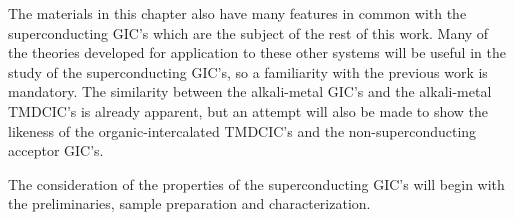         The materials  in this chapter  also have  many features in  common
with the superconducting  GIC's which are the subject  of the  rest of this
work.   Many of  the theories  developed   for  application to  these other
systems will  be useful in the study  of  the  superconducting GIC's, so  a
familiarity  with the previous  work is mandatory.   The similarity between
the alkali-metal GIC's  and the alkali-metal  TMDCIC's is already apparent,
but an  attempt will    also  be made  to    show  the likeness    of   the
organic-intercalated TMDCIC's and the non-superconducting acceptor GIC's.

        The consideration  of  the properties of the  superconducting GIC's
will begin with the preliminaries, sample preparation and characterization.
